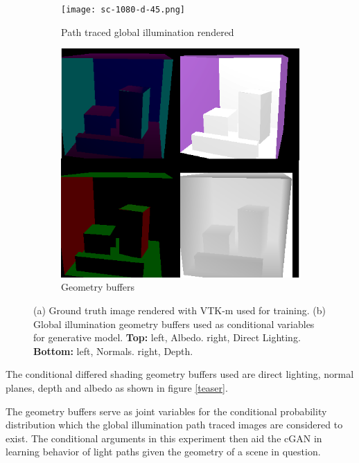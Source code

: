 \documentclass[conference]{IEEEtran}
\begin{document}
\begin{figure}
\centering
\begin{subfigure}{0.25\textwidth}
\centering
\texttt{[image: sc-1080-d-45.png]}
\caption{Path traced global illumination rendered}
\end{subfigure}%
\begin{subfigure}{.25\textwidth}
\centering
\includegraphics[width=.9\textwidth]{conditionals.png}
\caption{Geometry buffers}
\label{Gbuf}
\end{subfigure}
\caption{ (a) \textmd{Ground truth image rendered with VTK-m used for training.} (b) \textmd{Global illumination geometry buffers used as conditional variables for generative model. {\bf Top:} left, Albedo. right, Direct Lighting. {\bf Bottom:} left, Normals. right, Depth.}}
\end{figure}

The conditional differed shading geometry buffers used are direct lighting, normal planes, depth and albedo as shown in figure \ref{teaser}.

\begin{figure}


\end{figure}

The geometry buffers serve as joint variables for the conditional probability distribution which the global illumination path traced images are considered to exist. The conditional arguments in this experiment then aid the cGAN in learning behavior of light paths given the geometry of a scene in question. 
\end{document}
